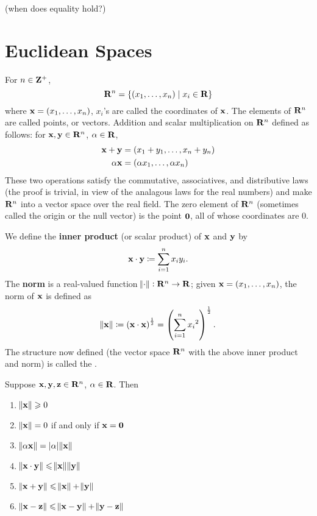 (when does equality hold?)

\section{Euclidean Spaces}
For $n\in\mathbf Z^+$, 
\[\mathbf R^n=\{(x_1,\dots,x_n)\mid x_i\in\mathbf R\}\]
where $\vb{x}=(x_1,\dots,x_n)$, $x_i$'s are called the coordinates of $\vb{x}$. The elements of $\mathbf R^n$ are called points, or vectors. Addition and scalar multiplication on $\mathbf R^n$ defined as follows: for $\vb{x},\vb{y}\in\mathbf R^n$, $\alpha\in\mathbf R$,
\begin{align*}
\vb{x}+\vb{y}&=(x_1+y_1,\dots,x_n+y_n)\\
\alpha\vb{x}&=(\alpha x_1,\dots,\alpha x_n)
\end{align*}
These two operations satisfy the commutative, associatives, and distributive laws (the proof is trivial, in view of the analagous laws for the real numbers) and make $\mathbf R^n$ into a vector space over the real field. The zero element of $\mathbf R^n$ (sometimes called the origin or the null vector) is the point $\vb{0}$, all of whose coordinates are $0$.

We define the \textbf{inner product} (or scalar product) of $\vb{x}$ and $\vb{y}$ by
\[\vb{x}\cdot\vb{y}\coloneqq\sum_{i=1}^nx_iy_i.\]
The \textbf{norm} is a real-valued function $\norm{\cdot}:\mathbf R^n\to\mathbf R$; given $\vb{x}=(x_1,\dots,x_n)$, the norm of $\vb{x}$ is defined as
\[\norm{\vb{x}}\coloneqq\left(\vb{x}\cdot\vb{x}\right)^\frac{1}{2}=\left(\sum_{i=1}^n{x_i}^2\right)^\frac{1}{2}.\]
The structure now defined (the vector space $\mathbf R^n$ with the above inner product and norm) is called the .

\begin{proposition}
Suppose $\vb{x},\vb{y},\vb{z}\in\mathbf R^n$, $\alpha\in\mathbf R$. Then
\begin{enumerate}[label=(\roman*)]
\item $\norm{\vb{x}}\geqslant0$
\item $\norm{\vb{x}}=0$ if and only if $\vb{x}=\vb{0}$
\item $\norm{\alpha\vb{x}}=|\alpha|\norm{\vb{x}}$
\item $\norm{\vb{x}\cdot\vb{y}}\leqslant\norm{\vb{x}}\norm{\vb{y}}$
\item $\norm{\vb{x}+\vb{y}}\leqslant\norm{\vb{x}}+\norm{\vb{y}}$
\item $\norm{\vb{x}-\vb{z}}\leqslant\norm{\vb{x}-\vb{y}}+\norm{\vb{y}-\vb{z}}$
\end{enumerate}
\end{proposition}

